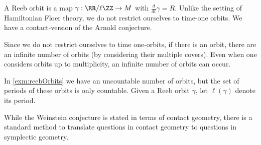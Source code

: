 





A Reeb orbit is a map $\gamma: \RR/\ell\ZZ\to M$ with $\frac{d}{dt}\gamma = R$. Unlike the setting of Hamiltonian Floer theory, we do not restrict ourselves to time-one orbits. We have a contact-version of the Arnold conjecture.

Since we do not restrict ourselves to time one-orbits, if there is an orbit, there are an infinite number of orbits (by considering their multiple covers). Even when one considers orbits up to multiplicity, an infinite number of orbits can occur.



In \cref{exm:reebOrbits} we have an uncountable number of orbits, but the set of periods of these orbits is only countable.  Given a Reeb orbit $\gamma$, let $\ell(\gamma)$ denote its period.


While the Weinstein conjecture is stated in terms of contact geometry, there is a standard method to translate questions in contact geometry to questions in symplectic geometry.




